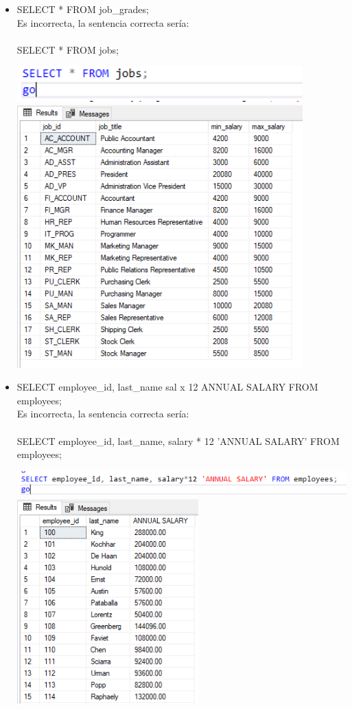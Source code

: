 \begin{itemize}
	\item SELECT * FROM job\_grades;
	\\Es incorrecta, la sentencia correcta sería:
	\\
	\\SELECT * FROM jobs;
	\begin{center}
	\includegraphics[width=11cm]{./Imagenes/actividad_01_02a} 
	\includegraphics[width=11cm]{./Imagenes/actividad_01_02} 
	\end{center}
	
	\item SELECT employee\_id, last\_name sal x 12 ANNUAL SALARY FROM employees;
	\\Es incorrecta, la sentencia correcta sería:
	\\
	\\SELECT employee\_id, last\_name, salary * 12 'ANNUAL SALARY' FROM employees;
	\begin{center}
	\includegraphics[width=15cm]{./Imagenes/actividad_01_03a} 
	\includegraphics[width=7cm]{./Imagenes/actividad_01_03} 
	\end{center}

\end{itemize} 